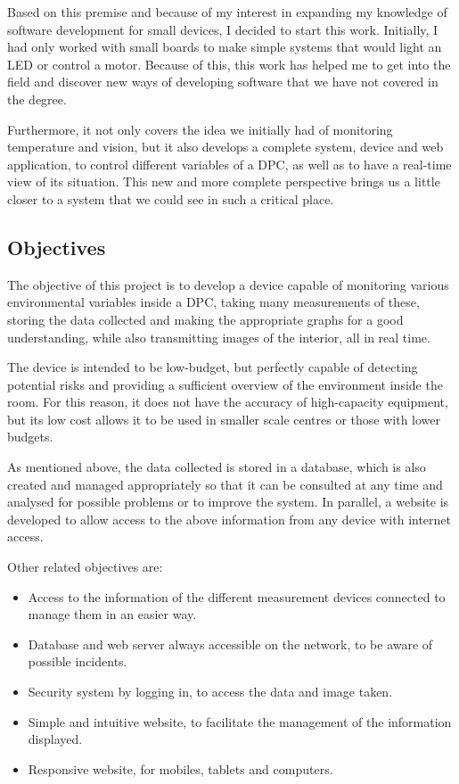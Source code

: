 Based on this premise and because of my interest in expanding my knowledge of software development for small devices, I decided to start this work. Initially, I had only worked with small boards to make simple systems that would light an LED or control a motor. Because of this, this work has helped me to get into the field and discover new ways of developing software that we have not covered in the degree.
\pagebreak

Furthermore, it not only covers the idea we initially had of monitoring temperature and vision, but it also develops a complete system, device and web application, to control different variables of a DPC, as well as to have a real-time view of its situation. This new and more complete perspective brings us a little closer to a system that we could see in such a critical place.

\subsection{Objectives}\label{subsec:objectives}
The objective of this project is to develop a device capable of monitoring various environmental variables inside a DPC, taking many measurements of these, storing the data collected and making the appropriate graphs for a good understanding, while also transmitting images of the interior, all in real time.

The device is intended to be low-budget, but perfectly capable of detecting potential risks and providing a sufficient overview of the environment inside the room. For this reason, it does not have the accuracy of high-capacity equipment, but its low cost allows it to be used in smaller scale centres or those with lower budgets.

As mentioned above, the data collected is stored in a database, which is also created and managed appropriately so that it can be consulted at any time and analysed for possible problems or to improve the system. In parallel, a website is developed to allow access to the above information from any device with internet access.

Other related objectives are:
\begin{itemize}
	\item Access to the information of the different measurement devices connected to manage them in an easier way.
	\item Database and web server always accessible on the network, to be aware of possible incidents.
	\item Security system by logging in, to access the data and image taken.
	\item Simple and intuitive website, to facilitate the management of the information displayed.
	\item Responsive website, for mobiles, tablets and computers.
\end{itemize}

